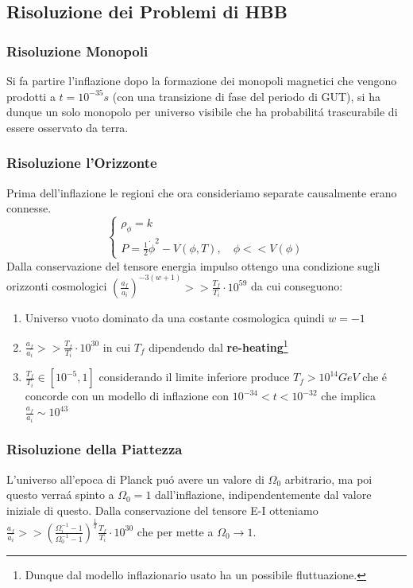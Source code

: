 \documentclass[12pt, a4paper]{article}
\begin{document}
\subsection{Risoluzione dei Problemi di HBB}
\subsubsection{Risoluzione Monopoli}
Si fa partire l'inflazione dopo la formazione dei monopoli magnetici che vengono prodotti a $t=10^{-35}s$ (con una transizione di fase del periodo di GUT), si ha dunque un solo monopolo per universo visibile che ha probabilit\'{a} trascurabile di essere osservato da terra.
\subsubsection{Risoluzione l'Orizzonte}
Prima dell'inflazione le regioni che ora consideriamo separate causalmente erano connesse.
\begin{equation}
\begin{cases}
\rho_{\phi}=k
\\
P=\frac{1}{2}\dot{\phi}^2-V(\phi,T), \quad \phi<< V(\phi)
\end{cases}
\end{equation}
Dalla conservazione del tensore energia impulso ottengo una condizione sugli orizzonti cosmologici $(\frac{a_f}{a_i})^{-3(w+1)}>>\frac{T_f}{T_i}\cdot 10^{59}$ da cui conseguono:
\begin{enumerate}
\item Universo vuoto dominato da una costante cosmologica quindi $w=-1$
\item  $\frac{a_f}{a_i}>>\frac{T_f}{T_i}\cdot 10^{30}$ in cui $T_f$ dipendendo dal \textbf{re-heating}\footnote{Dunque dal modello inflazionario usato ha un possibile fluttuazione.}
\item $\frac{T_f}{T_i}\in [10^{-5}, 1]$ considerando il limite inferiore produce $T_f > 10^{14} GeV$ che \'{e} concorde con un modello di inflazione con $10^{-34}<t<10^{-32}$ che implica $\frac{a_f}{a_i}\sim 10^{43}$
\end{enumerate}
\subsubsection{Risoluzione della Piattezza}
L'universo all'epoca di Planck pu\'{o} avere un valore di $\Omega_0$ arbitrario, ma poi questo verra\'{a} spinto a $\Omega_0=1$ dall'inflazione, indipendentemente dal valore iniziale di questo. Dalla conservazione del tensore E-I otteniamo $\frac{a_f}{a_i}>>(\frac{\Omega_i^{-1}-1}{\Omega_0^{-1}-1})^{\frac{1}{2}}\frac{T_f}{T_i}\cdot 10^{30}$  che per mette a $\Omega_0 \rightarrow 1$.
\end{document}
